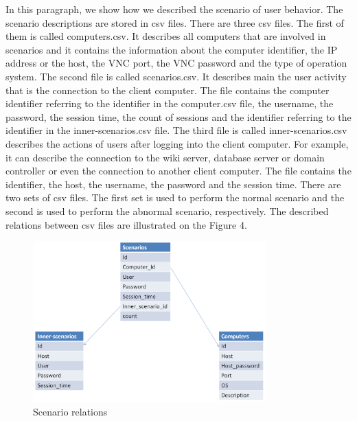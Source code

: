 In this paragraph, we show how we described the scenario of user behavior. The scenario descriptions are stored in csv files. There are three csv files. The first of them is called computers.csv. It describes all computers that are involved in scenarios and it contains the information about the computer identifier, the IP address or the host, the VNC port, the VNC password and the type of operation system.
The second file is called scenarios.csv. It describes main the user activity that is the connection to the client computer. The file contains the computer identifier referring to the identifier in the computer.csv file, the username, the password, the session time, the count of sessions and the identifier referring to the identifier in the inner-scenarios.csv file. The third file is called inner-scenarios.csv describes the actions of users after logging into the client computer. For example, it can describe the connection to the wiki server, database server or domain controller or even the connection to another client computer. The file contains the identifier, the host, the username, the password and the session time. There are two sets of csv files. The first set is used to perform the normal scenario and the second is used to perform the abnormal scenario, respectively. The described relations between csv files are illustrated on the Figure 4.
 	
 	
\begin{figure}[ht!]
\centering
\includegraphics[width=0.8\textwidth]{scenario_relations.png}
\caption{Scenario relations}
\label{overflow}
\end{figure}

